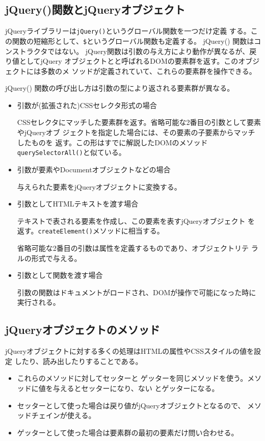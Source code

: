 \subsection{jQuery()関数とjQueryオブジェクト}
jQueryライブラリーは\texttt{jQuery()}というグローバル関数を一つだけ定義
する。この関数の短縮形として、\texttt{\$}というグローバル関数も定義する。
jQuery() 関数はコンストラクタではない。
jQuery関数は引数の与え方により動作が異なるが、戻り値としてjQuery
オブジェクトとと呼ばれるDOMの要素群を返す。このオブジェクトには多数のメ
ソッドが定義されていて、これらの要素群を操作できる。

jQuery() 関数の呼び出し方は引数の型により返される要素群が異なる。
\begin{itemize}
 \item 引数が(拡張された)CSSセレクタ形式の場合

 CSSセレクタにマッチした要素群を返す。省略可能な2番目の引数として要素やjQueryオブ
       ジェクトを指定した場合には、その要素の子要素からマッチしたものを
       返す。この形はすでに解説したDOMのメソッド
       \texttt{querySelectorAll()}と似ている。
 \item 引数が要素やDocumentオブジェクトなどの場合

       与えられた要素をjQueryオブジェクトに変換する。
 \item 引数としてHTMLテキストを渡す場合

       テキストで表される要素を作成し、この要素を表すjQueryオブジェクト
       を返す。\texttt{createElement()}メソッドに相当する。

       省略可能な2番目の引数は属性を定義するものであり、オブジェクトリテ
       ラルの形式で与える。
 \item 引数として関数を渡す場合

       引数の関数はドキュメントがロードされ、DOMが操作で可能になった時に実行される。
\end{itemize}
\subsection{jQueryオブジェクトのメソッド}
jQueryオブジェクトに対する多くの処理はHTMLの属性やCSSスタイルの値を設定
したり、読み出したりすることである。
\begin{itemize}
 \item これらのメソッドに対してセッターと
ゲッターを同じメソッドを使う。メソッドに値を与えるとセッターになり、ない
とゲッターになる。
 \item セッターとして使った場合は戻り値がjQueryオブジェクトとなるので、
       メソッドチェインが使える。
 \item ゲッターとして使った場合は要素群の最初の要素だけ問い合わせる。
\end{itemize}
